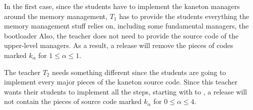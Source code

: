 In the first case, since the students have to implement the kaneton managers
around the memory management, $T_{1}$ has to provide the students everything
the memory management stuff relies on, including some fundamental managers,
the bootloader \etc{} Also, the teacher does not need to provide the source
code of the upper-level managers. As a result, a  release will
remove the pieces of codes marked $k_{\alpha}$ for $1 \le \alpha \le 1$.

The teacher $T_{2}$ needs something different since the students are going
to implement every major pieces of the kaneton source code. Since this teacher
wants their students to implement all the steps, starting with 
to , a  release will not contain the pieces of source
code marked $k_{\alpha}$ for $0 \le \alpha \le 4$.

